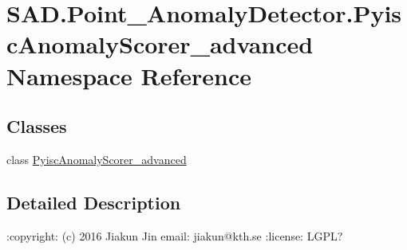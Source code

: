 \hypertarget{namespaceSAD_1_1Point__AnomalyDetector_1_1PyiscAnomalyScorer__advanced}{}\section{S\+A\+D.\+Point\+\_\+\+Anomaly\+Detector.\+Pyisc\+Anomaly\+Scorer\+\_\+advanced Namespace Reference}
\label{namespaceSAD_1_1Point__AnomalyDetector_1_1PyiscAnomalyScorer__advanced}
\subsection*{Classes}
\begin{DoxyCompactItemize}
\item 
class \hyperlink{classSAD_1_1Point__AnomalyDetector_1_1PyiscAnomalyScorer__advanced_1_1PyiscAnomalyScorer__advanced}{Pyisc\+Anomaly\+Scorer\+\_\+advanced}
\end{DoxyCompactItemize}


\subsection{Detailed Description}
\begin{DoxyVerb}:copyright: (c) 2016 Jiakun Jin
email: jiakun@kth.se
:license: LGPL?
\end{DoxyVerb}
 